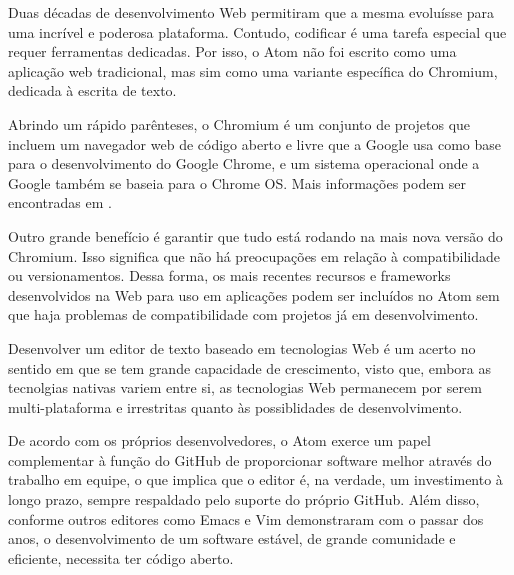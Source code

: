 	Duas décadas de desenvolvimento Web permitiram que a mesma evoluísse para uma incrível e poderosa plataforma. Contudo, codificar é uma tarefa especial que requer ferramentas dedicadas. Por isso, o Atom não foi escrito como uma aplicação web tradicional, mas sim como uma variante específica do Chromium, dedicada à escrita de texto.

	Abrindo um rápido parênteses, o Chromium é um conjunto de projetos que incluem um navegador web de código aberto e livre que a Google usa como base para o desenvolvimento do Google Chrome, e um sistema operacional onde a Google também se baseia para o Chrome OS. Mais informações podem ser encontradas em \cite{doc:chromium}.

	Outro grande benefício é garantir que tudo está rodando na mais nova versão do Chromium. Isso significa que não há preocupações em relação à compatibilidade ou versionamentos. Dessa forma, os mais recentes recursos e frameworks desenvolvidos na Web para uso em aplicações podem ser incluídos no Atom sem que haja problemas de compatibilidade com projetos já em desenvolvimento.

	Desenvolver um editor de texto baseado em tecnologias Web é um acerto no sentido em que se tem grande capacidade de crescimento, visto que, embora as tecnolgias nativas variem entre si, as tecnologias Web permanecem por serem multi-plataforma e irrestritas quanto às possiblidades de desenvolvimento.

	De acordo com os próprios desenvolvedores, o Atom exerce um papel complementar à função do GitHub de proporcionar software melhor através do trabalho em equipe, o que implica que o editor é, na verdade, um investimento à longo prazo, sempre respaldado pelo suporte do próprio GitHub. Além disso, conforme outros editores como Emacs e Vim demonstraram com o passar dos anos, o desenvolvimento de um software estável, de grande comunidade e eficiente, necessita ter código aberto.


	
	


